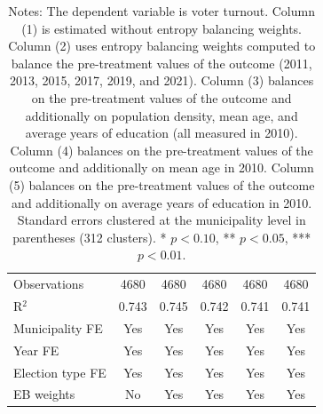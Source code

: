 \begin{table}[!h]
\begin{tabular}[t]{lccccc}
\addlinespace
Observations & 4680 & 4680 & 4680 & 4680 & 4680\\
R$^2$ & 0.743 & 0.745 & 0.742 & 0.741 & 0.741\\
Municipality FE & Yes & Yes & Yes & Yes & Yes\\
Year FE & Yes & Yes & Yes & Yes & Yes\\
Election type FE & Yes & Yes & Yes & Yes & Yes\\
EB weights & No & Yes & Yes & Yes & Yes\\
\hline
\end{tabular}
\vspace{0.3em}
\captionsetup{justification=justified, singlelinecheck=false}
\caption*{\footnotesize Notes: The dependent variable is voter turnout. Column (1) is estimated without entropy balancing weights. Column (2) uses entropy balancing weights computed to balance the pre-treatment values of the outcome (2011, 2013, 2015, 2017, 2019, and 2021). Column (3) balances on the pre-treatment values of the outcome and additionally on population density, mean age, and average years of education (all measured in 2010). Column (4) balances on the pre-treatment values of the outcome and additionally on mean age in 2010. Column (5) balances on the pre-treatment values of the outcome and additionally on average years of education in 2010. Standard errors clustered at the municipality level in parentheses (312 clusters). * $p<0.10$, ** $p<0.05$, *** $p<0.01$.}
\end{table}
